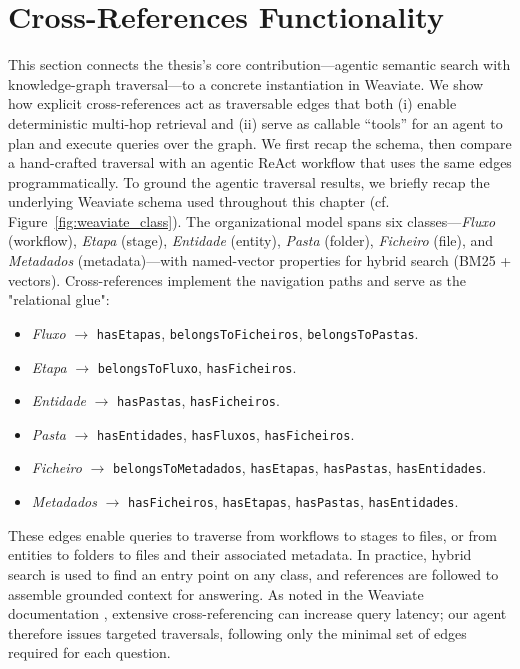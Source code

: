 \section{Cross-References Functionality}
\label{sec:crossrefs}
This section connects the thesis's core contribution—agentic semantic search with knowledge-graph traversal—to a concrete instantiation in Weaviate. We show how explicit cross-references act as traversable edges that both (i) enable deterministic multi-hop retrieval and (ii) serve as callable \enquote{tools} for an agent to plan and execute queries over the graph. We first recap the schema, then compare a hand-crafted traversal with an agentic ReAct workflow that uses the same edges programmatically.
To ground the agentic traversal results, we briefly recap the underlying Weaviate schema used throughout this chapter (cf. Figure~\ref{fig:weaviate_class}). The organizational model spans six classes—\textit{Fluxo} (workflow), \textit{Etapa} (stage), \textit{Entidade} (entity), \textit{Pasta} (folder), \textit{Ficheiro} (file), and \textit{Metadados} (metadata)—with named-vector properties for hybrid search (BM25 + vectors). Cross-references implement the navigation paths and serve as the "relational glue":
\begin{itemize}
    \item \textit{Fluxo} \(\rightarrow\) \texttt{hasEtapas}, \texttt{belongsToFicheiros}, \texttt{belongsToPastas}.
    \item \textit{Etapa} \(\rightarrow\) \texttt{belongsToFluxo}, \texttt{hasFicheiros}.
    \item \textit{Entidade} \(\rightarrow\) \texttt{hasPastas}, \texttt{hasFicheiros}.
    \item \textit{Pasta} \(\rightarrow\) \texttt{hasEntidades}, \texttt{hasFluxos}, \texttt{hasFicheiros}.
    \item \textit{Ficheiro} \(\rightarrow\) \texttt{belongsToMetadados}, \texttt{hasEtapas}, \texttt{hasPastas}, \texttt{hasEntidades}.
    \item \textit{Metadados} \(\rightarrow\) \texttt{hasFicheiros}, \texttt{hasEtapas}, \texttt{hasPastas}, \texttt{hasEntidades}.
\end{itemize}
These edges enable queries to traverse from workflows to stages to files, or from entities to folders to files and their associated metadata. In practice, hybrid search is used to find an entry point on any class, and references are followed to assemble grounded context for answering. As noted in the Weaviate documentation \cite{weaviate}, extensive cross-referencing can increase query latency; our agent therefore issues targeted traversals, following only the minimal set of edges required for each question.

